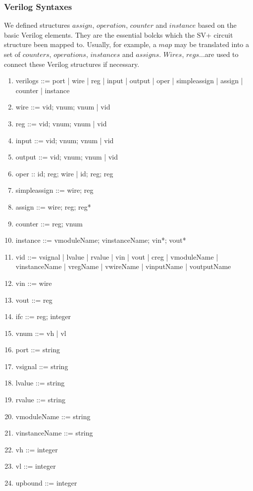 \subsubsection{Verilog Syntaxes}
\normalfont
We defined structures $assign$, $operation$, $counter$ and $instance$ based on the basic Verilog elements. They are the essential bolcks which the SV+ circuit structure been mapped to. Usually, for example, a $map$ may be translated into a set of $counters$, $operations$, $instances$ and $assigns$. $Wires$, $regs$...are used to connect these Verilog structures if necessary.
\itshape
\begin{enumerate}\itemsep2pt \parskip0pt 
  \item verilogs ::= port | wire | reg | input | output |
                     oper | simpleassign | assign |
                     counter | instance
  \item wire ::= vid; vnum; vnum | vid
  \item reg ::= vid; vnum; vnum | vid
  \item input ::= vid; vnum; vnum | vid
  \item output ::= vid; vnum; vnum | vid
  \item oper :: id; reg; wire | id; reg; reg
  \item simpleassign ::= wire; reg
  \item assign ::= wire; reg; reg*
  \item counter ::= reg; vnum
  \item instance ::= vmoduleName; vinstanceName; vin*; vout*
  \item vid ::= vsignal | lvalue | rvalue | vin
                | vout | creg | vmoduleName
                | vinstanceName | vregName | vwireName
                | vinputName | voutputName
  \item vin ::= wire
  \item vout ::= reg
  \item ifc ::= reg; integer
  \item vnum ::= vh | vl
  \item port ::= string
  \item vsignal ::= string
  \item lvalue ::= string
  \item rvalue ::= string
  \item vmoduleName ::= string
  \item vinstanceName ::= string
  \item vh ::= integer
  \item vl ::= integer
  \item upbound ::= integer
\end{enumerate}
